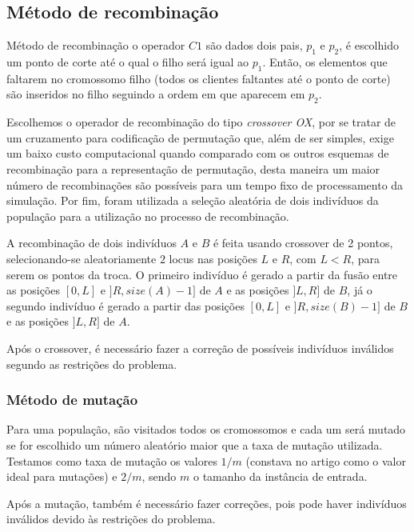 \documentclass[12pt,a4paper]{article}
\begin{document}
    \subsection{Método de recombinação}

        Método de recombinação o operador $C1$ são dados dois pais, $p_1$ e $p_2$, é escolhido um ponto de corte até o qual o filho será igual ao $p_1$. Então, os elementos que faltarem no
        cromossomo filho (todos os clientes faltantes até o ponto de corte) são inseridos no filho seguindo a ordem em que aparecem em $p_2$. 

        Escolhemos o operador de recombinação do tipo \emph{crossover OX}, por se tratar de um cruzamento para codificação de permutação que, além de ser simples, exige um baixo custo computacional
        quando comparado com os outros esquemas de recombinação para a representação de permutação, desta maneira um maior número de recombinações são possíveis para um tempo fixo de processamento
        da simulação. Por fim, foram utilizada a seleção aleatória de dois indivíduos da população para a utilização no processo de recombinação.

        A recombinação de dois indivíduos $A$ e $B$ é feita usando crossover de 2 pontos, selecionando-se aleatoriamente $2$ locus nas posições $L$ e $R$, com $L < R$, para serem os pontos da troca.
        O primeiro indivíduo é gerado a partir da fusão entre as posições $[0, L]$ e $]R, size(A) - 1]$ de $A$ e as posições $]L, R]$ de $B$, já o segundo indivíduo é gerado a partir das posições
        $[0, L]$ e $]R, size(B) - 1]$ de $B$ e as posições $]L, R]$ de $A$.

        Após o crossover, é necessário fazer a correção de possíveis indivíduos inválidos segundo as restrições do problema.

    \subsubsection{Método de mutação}

         Para uma população, são visitados todos os cromossomos e cada um será mutado se for escolhido um número aleatório maior que a taxa de mutação utilizada. Testamos como taxa de
         mutação os valores $1/m$ (constava no artigo como o valor ideal para mutações) e $2/m$, sendo $m$ o tamanho da instância de entrada.

        Após a mutação, também é necessário fazer correções, pois pode haver indivíduos inválidos devido às restrições do problema.
\end{document}
